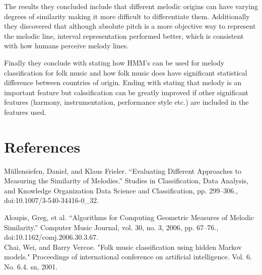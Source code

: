 \documentclass{article}
\begin{document}
	The results they concluded include that different melodic origins can have varying degrees of similarity making it more difficult to differentiate them. Additionally they discovered that although absolute pitch is a more objective way to represent the melodic line, interval representation performed better, which is consistent with how humans perceive melody lines.
	
	Finally they conclude with stating how HMM's can be used for melody classification for folk music and how folk music does have significant statistical difference between countries of origin. Ending with stating that melody is an important feature but calssification can be greatly improved if other significant features (harmony, instrumentation, performance style etc.) are included in the features used.
	 
	\section{References}
 	Müllensiefen, Daniel, and Klaus Frieler. “Evaluating Different Approaches to Measuring the Similarity of Melodies.” Studies in Classification, Data Analysis, and Knowledge Organization Data Science and Classification, pp. 299–306., doi:10.1007/3-540-34416-0\_32.
	\newline
	
	\noindent
	Aloupis, Greg, et al. “Algorithms for Computing Geometric Measures of Melodic Similarity.” Computer Music Journal, vol. 30, no. 3, 2006, pp. 67–76., doi:10.1162/comj.2006.30.3.67.
	\\
	
	\noindent
	Chai, Wei, and Barry Vercoe. "Folk music classification using hidden Markov models." Proceedings of international conference on artificial intelligence. Vol. 6. No. 6.4. sn, 2001.
	
	
	
\end{document}
